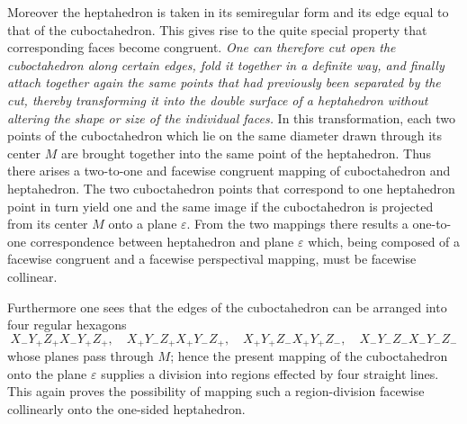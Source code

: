 \documentclass[11pt,a4paper]{article}
\begin{document}
Moreover the heptahedron is taken in its semiregular form and its edge equal to that of the cuboctahedron. This gives rise to the quite special property that corresponding faces become congruent. \emph{One can therefore cut open the cuboctahedron along certain edges, fold it together in a definite way, and finally attach together again the same points that had previously been separated by the cut, thereby transforming it into the double surface of a heptahedron without altering the shape or size of the individual faces.} In this transformation, each two points of the cuboctahedron which lie on the same diameter drawn through its center $M$ are brought together into the same point of the heptahedron. Thus there arises a two-to-one and facewise congruent mapping of cuboctahedron and heptahedron. The two cuboctahedron points that correspond to one heptahedron point in turn yield one and the same image if the cuboctahedron is projected from its center $M$ onto a plane $\varepsilon$. From the two mappings there results a one-to-one correspondence between heptahedron and plane $\varepsilon$ which, being composed of a facewise congruent and a facewise perspectival mapping, must be facewise collinear.

Furthermore one sees that the edges of the cuboctahedron can be arranged into four regular hexagons
\[
X_-Y_+Z_+X_-Y_+Z_+,
\quad X_+Y_-Z_+X_+Y_-Z_+,
\quad X_+Y_+Z_-X_+Y_+Z_-,
\quad X_-Y_-Z_-X_-Y_-Z_-
\]
whose planes pass through $M$; hence the present mapping of the cuboctahedron onto the plane $\varepsilon$ supplies a division into regions effected by four straight lines. This again proves the possibility of mapping such a region-division facewise collinearly onto the one-sided heptahedron.
\end{document}
